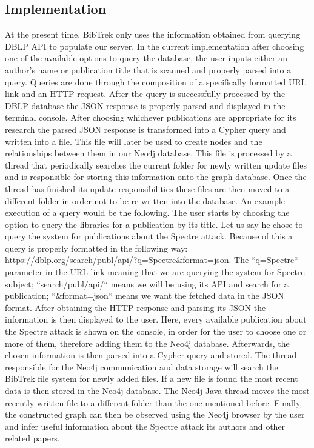 \documentclass[twocolumn]{article}
\begin{document}
\subsection{Implementation}
At the present time, BibTrek only uses the information obtained from querying DBLP API to populate our server. In the current implementation after choosing one of the available options to query the database, the user inputs either an author's name or publication title that is scanned and properly parsed into a query. Queries are done through the composition of a specifically formatted URL link and an HTTP request. After the query is successfully processed by the DBLP database the JSON response is properly parsed and displayed in the terminal console. After choosing whichever publications are appropriate for its research the parsed JSON response is transformed into a Cypher query and written into a file. This file will later be used to create nodes and the relationships between them in our Neo4j database. This file is processed by a thread that periodically searches the current folder for newly written update files and is responsible for storing this information onto the graph database. Once the thread has finished its update responsibilities these files are then moved to a different folder in order not to be re-written into the database. An example execution of a query would be the following. The user starts by choosing the option to query the libraries for a publication by its title. Let us say he chose to query the system for publications about the Spectre attack. Because of this a query is properly formatted in the following way: \url{https://dblp.org/search/publ/api/?q=Spectre&format=json}. The ``q=Spectre`` parameter in the URL link meaning that we are querying the system for Spectre subject; ``search/publ/api/`` means we will be using its API and search for a publication; ``&format=json`` means we want the fetched data in the JSON format. After obtaining the HTTP response and parsing its JSON the information is then displayed to the user. Here, every available publication about the Spectre attack is shown on the console, in order for the user to choose one or more of them, therefore adding them to the Neo4j database. Afterwards, the chosen information is then parsed into a Cypher query and stored. The thread responsible for the Neo4j communication and data storage will search the BibTrek file system for newly added files. If a new file is found the most recent data is then stored in the Neo4j database. The Neo4j Java thread moves the most recently written file to a different folder than the one mentioned before. Finally, the constructed graph can then be observed using the Neo4j browser by the user and infer useful information about the Spectre attack its authors and other related papers.
\end{document}
